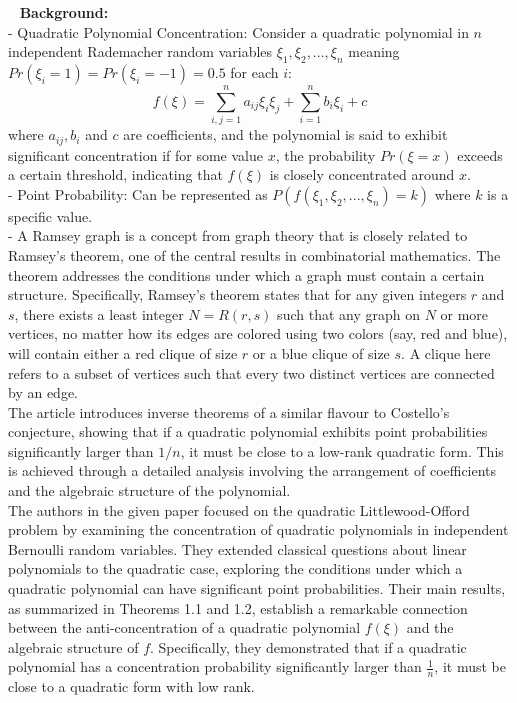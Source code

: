 

~\cite{kwan2019algebraic}
\textbf{Background:}\\
- Quadratic Polynomial Concentration: Consider a quadratic polynomial in ${n}$ independent Rademacher random variables ${\xi_1, \xi_2,...,\xi_n}$ meaning ${Pr(\xi_i=1)=Pr(\xi_i=-1)=0.5}$ for each ${i}$:
$${f(\xi)=\sum_{i,j=1}^{n} a_{ij} \xi_i \xi_j + \sum_{i=1}^{n} b_i \xi_i + c}$$
where ${a_{ij},b_i}$ and ${c}$ are coefficients, and the polynomial is said to exhibit significant concentration if for some value ${x}$, the probability ${Pr(\xi=x)}$ exceeds a certain threshold, indicating that ${f(\xi)}$ is closely concentrated around ${x}$.\\\newline
- Point Probability: Can be represented as ${P(f(\xi_1, \xi_2,...,\xi_n) = k)}$ where ${k}$ is a specific value.\\\newline
- A Ramsey graph is a concept from graph theory that is closely related to Ramsey's theorem, one of the central results in combinatorial mathematics. The theorem addresses the conditions under which a graph must contain a certain structure. Specifically, Ramsey's theorem states that for any given integers ${r}$ and ${s}$, there exists a least integer ${N=R(r,s)}$ such that any graph on ${N}$ or more vertices, no matter how its edges are colored using two colors (say, red and blue), will contain either a red clique of size ${r}$ or a blue clique of size ${s}$. A clique here refers to a subset of vertices such that every two distinct vertices are connected by an edge.\\\newline
The article introduces inverse theorems of a similar flavour to Costello’s conjecture, showing that if a quadratic polynomial exhibits point probabilities significantly larger than ${1/n}$, it must be close to a low-rank quadratic form. This is achieved through a detailed analysis involving the arrangement of coefficients and the algebraic structure of the polynomial.\\\newline
The authors in the given paper focused on the quadratic Littlewood-Offord problem by examining the concentration of quadratic polynomials in independent Bernoulli random variables. They extended classical questions about linear polynomials to the quadratic case, exploring the conditions under which a quadratic polynomial can have significant point probabilities. Their main results, as summarized in Theorems 1.1 and 1.2, establish a remarkable connection between the anti-concentration of a quadratic polynomial $f(\xi)$ and the algebraic structure of $f$. Specifically, they demonstrated that if a quadratic polynomial has a concentration probability significantly larger than $\frac{1}{n}$, it must be close to a quadratic form with low rank.\\\newline
